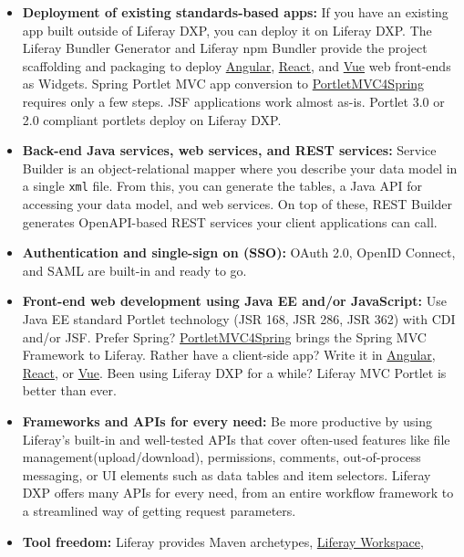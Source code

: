 \begin{itemize}
\item
  \textbf{Deployment of existing standards-based apps:} If you have an
  existing app built outside of Liferay DXP, you can deploy it on
  Liferay DXP. The Liferay Bundler Generator and Liferay npm Bundler
  provide the project scaffolding and packaging to deploy
  \href{https://angular.io/}{Angular},
  \href{https://reactjs.org/}{React}, and \href{https://vuejs.org/}{Vue}
  web front-ends as Widgets. Spring Portlet MVC app conversion to
  \href{https://github.com/liferay/portletmvc4spring}{PortletMVC4Spring}
  requires only a few steps. JSF applications work almost as-is. Portlet
  3.0 or 2.0 compliant portlets deploy on Liferay DXP.
\item
  \textbf{Back-end Java services, web services, and REST services:}
  Service Builder is an object-relational mapper where you describe your
  data model in a single \texttt{xml} file. From this, you can generate
  the tables, a Java API for accessing your data model, and web
  services. On top of these, REST Builder generates OpenAPI-based REST
  services your client applications can call.
\item
  \textbf{Authentication and single-sign on (SSO):} OAuth 2.0, OpenID
  Connect, and SAML are built-in and ready to go.
\item
  \textbf{Front-end web development using Java EE and/or JavaScript:}
  Use Java EE standard Portlet technology (JSR 168, JSR 286, JSR 362)
  with CDI and/or JSF. Prefer Spring?
  \href{https://github.com/liferay/portletmvc4spring}{PortletMVC4Spring}
  brings the Spring MVC Framework to Liferay. Rather have a client-side
  app? Write it in \href{https://angular.io/}{Angular},
  \href{https://reactjs.org/}{React}, or \href{https://vuejs.org/}{Vue}.
  Been using Liferay DXP for a while? Liferay MVC Portlet is better than
  ever.
\item
  \textbf{Frameworks and APIs for every need:} Be more productive by
  using Liferay's built-in and well-tested APIs that cover often-used
  features like file management(upload/download), permissions, comments,
  out-of-process messaging, or UI elements such as data tables and item
  selectors. Liferay DXP offers many APIs for every need, from an entire
  workflow framework to a streamlined way of getting request parameters.
\item
  \textbf{Tool freedom:} Liferay provides Maven archetypes,
  \href{/docs/7-2/reference/-/knowledge_base/r/liferay-workspace}{Liferay
  Workspace},

\end{itemize}
